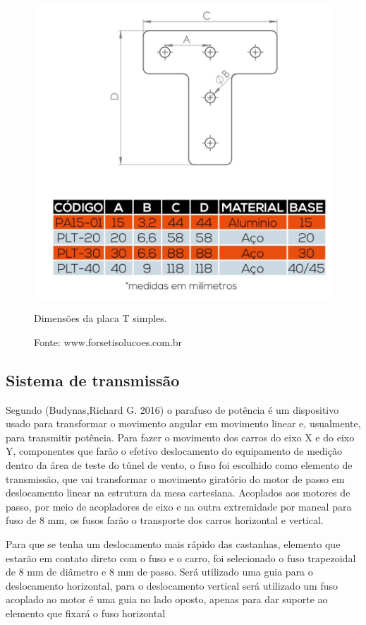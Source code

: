 \begin{figure}[!htb]
\centering
\includegraphics[scale = 1]{figuras/3-10}
\caption{Dimensões da placa T simples.}
\caption*{Fonte: www.forsetisolucoes.com.br}
\label{figplacatd}
\end{figure}
    
\subsection{Sistema de transmissão}

Segundo (Budynas,Richard G. 2016)  o parafuso de potência é um dispositivo usado para transformar 
o movimento angular em movimento linear e, usualmente, para transmitir potência. Para fazer o movimento 
dos carros do eixo X e do eixo Y, componentes que farão o efetivo deslocamento do equipamento de medição 
dentro da área de teste do túnel de vento, o fuso foi escolhido como elemento de transmissão, que vai 
transformar o movimento giratório do motor de passo em deslocamento linear na estrutura da mesa cartesiana. 
Acoplados aos motores de passo, por meio de acopladores de eixo e na outra extremidade por mancal para fuso 
de 8 mm, os fusos farão o transporte dos carros horizontal e vertical. 

Para que se tenha um deslocamento mais rápido das castanhas, elemento que estarão em contato 
direto com o fuso e o carro, foi selecionado o fuso trapezoidal de  8 mm de diâmetro e 8 mm de passo.  
Será utilizado uma guia para o deslocamento horizontal, para o deslocamento vertical será utilizado 
um fuso acoplado ao motor é uma guia no lado oposto, apenas para dar suporte ao elemento que fixará 
o fuso horizontal 

